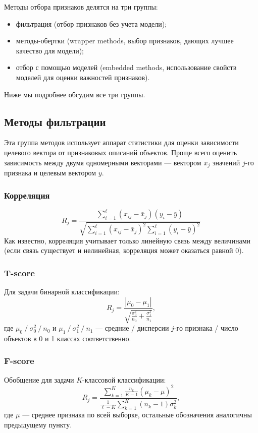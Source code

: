 \documentclass[12pt,a4paper]{article}
\begin{document}
	Методы отбора признаков делятся на три группы:
	\begin{itemize}
		\item фильтрация (отбор признаков без учета модели);
		\item методы-обертки (wrapper methods, выбор признаков, дающих лучшее качество для модели);
		\item отбор с помощью моделей (embedded methods, использование свойств моделей для оценки важностей признаков).
	\end{itemize}
   
   Ниже мы подробнее обсудим все три группы.
  
	\par 
	\subsection{Методы фильтрации}
	Эта группа методов использует аппарат статистики для оценки зависимости целевого вектора от признаковых описаний объектов. Проще всего оценить зависимость между двумя одномерными векторами --- вектором $x_j$ значений $j$-го признака и целевым вектором $y$.
	\subsubsection{Корреляция}
	\[
	R_j = \frac{\sum_{i=1}^\ell (x_{ij}-\bar x_j)(y_i - \bar y) }{\sqrt{\sum_{i=1}^\ell (x_{ij}-\bar x_j)^2\sum_{i=1}^\ell (y_i - \bar y)^2}  }
	\]
	Как известно, корреляция учитывает только линейную связь между величинами (если связь существует и нелинейная, корреляция может оказаться равной 0).
	\subsubsection{T-score}
	Для задачи бинарной классификации:
	\[
	R_j = \frac {|\mu_0 - \mu_1|} {\sqrt{\frac {\sigma_0^2}{n_0} + \frac {\sigma_1^2}{n_1} }},
	\]
	где $\mu_0 ~/~ \sigma^2_0~/~n_0$  и $\mu_1 ~/~ \sigma^2_1~/~n_1$ --- средние / дисперсии $j$-го признака / число объектов в 0 и 1 классах соответственно.
		\subsubsection{F-score}
	Обобщение для задачи $K$-классовой классификации:
	\[
	R_j = \frac {\sum_{k=1}^K \frac {n_k}{K-1} (\mu_k - \mu)^2}   {\frac 1 {\ell-K} \sum_{k=1}^K (n_k -1) \sigma_k^2},
	\]
	где $\mu$ --- среднее признака по всей выборке, остальные обозначения аналогичны предыдущему пункту.
	
\end{document}
